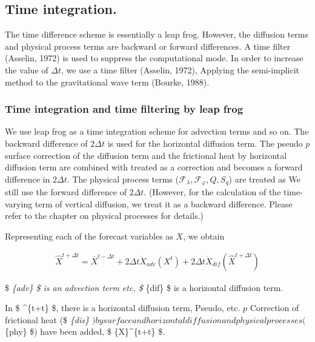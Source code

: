 \hypertarget{time-integration.}{%
\subsection{Time integration.}\label{time-integration.}}

The time difference scheme is essentially a leap frog. However, the
diffusion terms and physical process terms are backward or forward
differences. A time filter (Asselin, 1972) is used to suppress the
computational mode. In order to increase the value of \(\Delta t\), we
use a time filter (Asselin, 1972), Applying the semi-implicit method to
the gravitational wave term (Bourke, 1988).

\hypertarget{time-integration-and-time-filtering-by-leap-frog}{%
\subsubsection{Time integration and time filtering by leap
frog}\label{time-integration-and-time-filtering-by-leap-frog}}

We use leap frog as a time integration scheme for advection terms and so
on. The backward difference of \(2 \Delta t\) is used for the horizontal
diffusion term. The pseudo \(p\) surface correction of the diffusion
term and the frictional heat by horizontal diffusion term are combined
with treated as a correction and becomes a forward difference in
\(2 \Delta t\). The physical process terms
(\({\mathcal F}_\lambda, {\mathcal F}_\varphi, Q, S_q\)) are treated as
We still use the forward difference of \(2 \Delta t\). (However, for the
calculation of the time-varying term of vertical diffusion, we treat it
as a backward difference. Please refer to the chapter on physical
processes for details.)

Representing each of the forecast variables as \({X}\), we obtain

\begin{eqnarray}
  \hat{X}^{t+\Delta t} 
    =  \bar{X}^{t-\Delta t}
    + 2 \Delta t 
      \dot{X}_{adv}\left( {X}^{t} \right)
    + 2 \Delta t 
      \dot{X}_{dif}\left( \hat{X}^{t+\Delta t} \right)
\end{eqnarray}

\$ \emph{\{adv\} \$ is an advection term etc, \$ }\{dif\}
\$ is a horizontal diffusion term.

In \$ \^{}\{t+\Delta t\} \$, there is a horizontal diffusion
term, Pseudo, etc. \(p\) Correction of frictional heat (\$
\emph{\{dis\}
\() by surface and horizontal diffusion and physical processes (\)
}\{phy\} \$) have been added, \$ \{X\}\^{}\{t+\Delta t\} \$.

